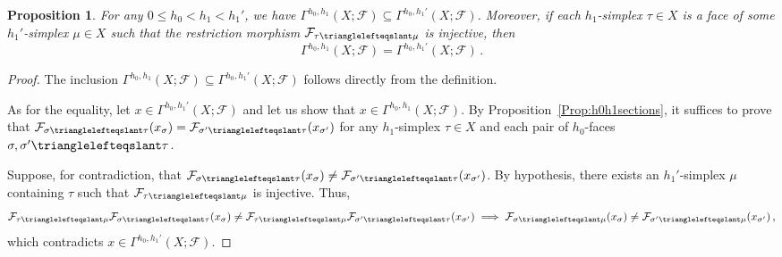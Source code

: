 \documentclass[reqno,12pt]{amsart}
\newcommand{\face}{{\trianglelefteqslant}}
\newcommand{\cF}{{\mathcal F}}
\newcommand{\0}{\mathbf 0}
\newtheorem{proposition}[theorem]{Proposition}
\theoremstyle{definition}
\begin{document}
\begin{proposition}\label{Prop:InclusionGlobalSections}
    For any $0\leq h_0<h_1< h_1'$, we have $\Gamma^{h_0,h_1}(X;\cF)\subseteq \Gamma^{h_0,h_1'}(X;\cF)$. Moreover, if each $h_1$-simplex $\tau\in X$ is a face of some $h_1'$-simplex $\mu\in X$ such that the restriction morphism $\cF_{\tau\face \mu}$ is injective, then
    \[
    \Gamma^{h_0,h_1}(X;\cF)=\Gamma^{h_0,h_1'}(X;\cF)\,.
    \]
\end{proposition}
\begin{proof}
         The inclusion $\Gamma^{h_0,h_1}(X;\cF)\subseteq \Gamma^{h_0,h_1'}(X;\cF)$ follows directly from the definition.
    
    As for the equality, let $x\in\Gamma^{h_0,h_1'}(X;\cF)$ and let us show that $x\in \Gamma^{h_0,h_1}(X;\cF)$. By Proposition~\ref{Prop:h0h1sections}, it suffices to prove that $\cF_{\sigma\face\tau}(x_\sigma)=\cF_{\sigma'\face\tau}(x_{\sigma'})$ for any $h_1$-simplex $\tau\in X$ and each pair of $h_0$-faces $\sigma,\sigma'\face \tau$.

    Suppose, for contradiction, that $\cF_{\sigma\face\tau}(x_\sigma)\neq\cF_{\sigma'\face\tau}(x_{\sigma'})$. By hypothesis, there exists an $h_1'$-simplex $\mu$ containing $\tau$ such that $\cF_{\tau\face \mu}$ is injective. Thus,
    \[
    \cF_{\tau\face \mu}\cF_{\sigma\face\tau}(x_\sigma)\neq\cF_{\tau\face \mu}\cF_{\sigma'\face\tau}(x_{\sigma'})\implies \cF_{\sigma\face\mu}(x_\sigma)\neq\cF_{\sigma'\face\mu}(x_{\sigma'})\, ,
    \]
    which contradicts $x\in \Gamma^{h_0,h_1'}(X;\cF)$.
\end{proof}
\end{document}

